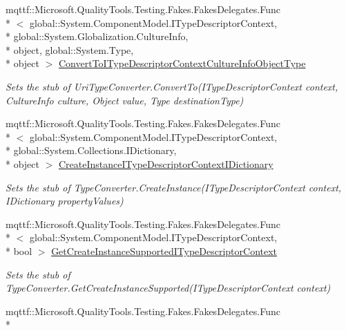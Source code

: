 \begin{DoxyCompactItemize}
mqttf\-::\-Microsoft.\-Quality\-Tools.\-Testing.\-Fakes.\-Fakes\-Delegates.\-Func\\*
$<$ global\-::\-System.\-Component\-Model.\-I\-Type\-Descriptor\-Context, \\*
global\-::\-System.\-Globalization.\-Culture\-Info, \\*
object, global\-::\-System.\-Type, \\*
object $>$ \hyperlink{class_system_1_1_fakes_1_1_stub_uri_type_converter_ab43ced893a1f4cac2567df4b0619c8c8}{Convert\-To\-I\-Type\-Descriptor\-Context\-Culture\-Info\-Object\-Type}
\begin{DoxyCompactList}\small\item\em Sets the stub of Uri\-Type\-Converter.\-Convert\-To(\-I\-Type\-Descriptor\-Context context, Culture\-Info culture, Object value, Type destination\-Type)\end{DoxyCompactList}\item 
mqttf\-::\-Microsoft.\-Quality\-Tools.\-Testing.\-Fakes.\-Fakes\-Delegates.\-Func\\*
$<$ global\-::\-System.\-Component\-Model.\-I\-Type\-Descriptor\-Context, \\*
global\-::\-System.\-Collections.\-I\-Dictionary, \\*
object $>$ \hyperlink{class_system_1_1_fakes_1_1_stub_uri_type_converter_aad35d6691a0a160689283898c368c097}{Create\-Instance\-I\-Type\-Descriptor\-Context\-I\-Dictionary}
\begin{DoxyCompactList}\small\item\em Sets the stub of Type\-Converter.\-Create\-Instance(\-I\-Type\-Descriptor\-Context context, I\-Dictionary property\-Values)\end{DoxyCompactList}\item 
mqttf\-::\-Microsoft.\-Quality\-Tools.\-Testing.\-Fakes.\-Fakes\-Delegates.\-Func\\*
$<$ global\-::\-System.\-Component\-Model.\-I\-Type\-Descriptor\-Context, \\*
bool $>$ \hyperlink{class_system_1_1_fakes_1_1_stub_uri_type_converter_a35758fba0825600b23fd4be20daf3516}{Get\-Create\-Instance\-Supported\-I\-Type\-Descriptor\-Context}
\begin{DoxyCompactList}\small\item\em Sets the stub of Type\-Converter.\-Get\-Create\-Instance\-Supported(\-I\-Type\-Descriptor\-Context context)\end{DoxyCompactList}\item 
mqttf\-::\-Microsoft.\-Quality\-Tools.\-Testing.\-Fakes.\-Fakes\-Delegates.\-Func\\*

\end{DoxyCompactItemize}
